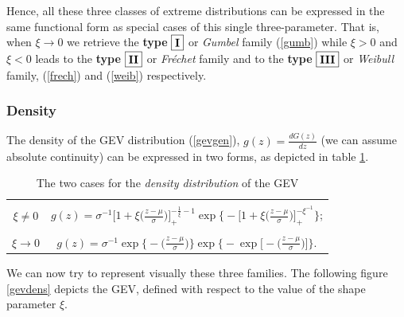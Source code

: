\documentclass[11pt,a4paper,openany ]{book}
\begin{document}


Hence, all these three classes of extreme distributions can be expressed in the same functional form as special cases of this single three-parameter. That is, when $\xi\rightarrow 0$ we retrieve the \textbf{type} $\boxed{\textbf{\text{I}}}$ or \emph{Gumbel} family (\ref{gumb}) while $\xi >0$ and $\xi <0$ leads to the \textbf{type} $\boxed{\textbf{\text{II}}}$  or \emph{Fréchet} family and to the \textbf{type} $\boxed{\textbf{\text{III}}}$ or \emph{Weibull} family, (\ref{frech}) and (\ref{weib}) respectively. 



\subsubsection*{Density} 
The density of the GEV distribution (\ref{gevgen}), $g(z)=\frac{d G(z)}{dz}$ (we can assume absolute continuity) can be expressed in two forms, as depicted in table \ref{tab:gevdens}.

\begin{table}[!htb]
\centering\caption{The two cases for the \emph{density distribution} of the GEV}\label{tab:gevdens}
\begin{tabular}{|c|c}
\hline \\
$\xi\neq 0$ &  $g(z)=\sigma^{-1}\bigg[1+\xi\bigg(\frac{z-\mu}{\sigma}\bigg)\bigg]_+^{-\frac{1}{\xi}-1}\exp\Bigg\{-\bigg[1+\xi\bigg(\frac{z-\mu}{\sigma}\bigg)\bigg]_+^{-\xi^{-1}}\Bigg\}$; \\
 \hline  \\
$\xi\to 0$ & $g(z)= \sigma^{-1}\exp\bigg\{-\bigg(\frac{z-\mu}{\sigma}\bigg)\bigg\}\exp\Bigg\{-\exp\bigg[-\bigg(\frac{z-\mu}{\sigma}\bigg)\bigg]\Bigg\}$. \\ 
\hline 
\end{tabular}
\end{table}

We can now try to represent visually these three families. The following figure \ref{gevdens} depicts the GEV, defined with respect to the value of the shape parameter $\xi$.
\end{document}
